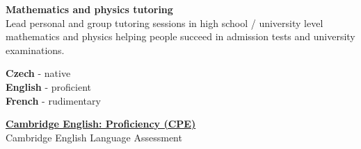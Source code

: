 \documentclass[9pt]{developercv} %
\begin{document}
\textbf{Mathematics and physics tutoring}\\Lead personal and group tutoring sessions in high school / university level mathematics and physics helping people succeed in admission tests and university examinations.


\begin{minipage}[t]{0.5\textwidth}
	\vspace{-\baselineskip} %

	
	\textbf{Czech} - native\\
	\textbf{English} - proficient\\
	\textbf{French} - rudimentary\\
\end{minipage}
\hfill
\begin{minipage}[t]{0.5\textwidth}
	\vspace{-\baselineskip} %
	

	{\textbf{\href{http://www.cambridgeenglish.org/exams/proficiency/?utm_campaign=linkedinprof}{Cambridge English: Proficiency (CPE)}}\\\footnotesize{Cambridge English Language Assessment}}
\end{minipage}
\hfill
\\
% 	
% 	
{}
\end{document}
